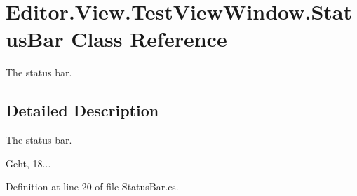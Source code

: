 \section{Editor.\-View.\-Test\-View\-Window.\-Status\-Bar Class Reference}
\label{class_editor_1_1_view_1_1_test_view_window_1_1_status_bar}


The status bar.  




\subsection{Detailed Description}
The status bar. 

Geht, 18... 

Definition at line 20 of file Status\-Bar.\-cs.

